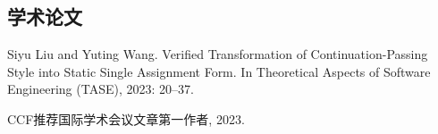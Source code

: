 
\begin{achievements}

\subsection*{学术论文}

\begin{bibliolist}{00}
  \item Siyu Liu and Yuting Wang. Verified Transformation of Continuation-Passing 
    Style into Static Single Assignment Form. 
    In Theoretical Aspects of Software Engineering (TASE), 2023: 20–37. 
\end{bibliolist}

\begin{bibliolist*}{00}
  \item CCF推荐国际学术会议文章第一作者, 2023.
\end{bibliolist*}

\end{achievements}
